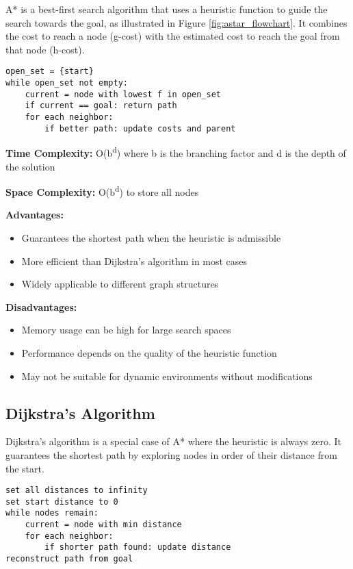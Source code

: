\documentclass[11pt,a4paper]{report}
\begin{document}
A* is a best-first search algorithm that uses a heuristic function to guide the search towards the goal, as illustrated in Figure \ref{fig:astar_flowchart}. It combines the cost to reach a node (g-cost) with the estimated cost to reach the goal from that node (h-cost).

\begin{verbatim}
open_set = {start}
while open_set not empty:
    current = node with lowest f in open_set
    if current == goal: return path
    for each neighbor:
        if better path: update costs and parent
\end{verbatim}

\textbf{Time Complexity:} O(b\textsuperscript{d}) where b is the branching factor and d is the depth of the solution

\textbf{Space Complexity:} O(b\textsuperscript{d}) to store all nodes

\textbf{Advantages:}
\begin{itemize}
    \item Guarantees the shortest path when the heuristic is admissible
    \item More efficient than Dijkstra's algorithm in most cases
    \item Widely applicable to different graph structures
\end{itemize}

\textbf{Disadvantages:}
\begin{itemize}
    \item Memory usage can be high for large search spaces
    \item Performance depends on the quality of the heuristic function
    \item May not be suitable for dynamic environments without modifications
\end{itemize}

\subsection{Dijkstra's Algorithm}
Dijkstra's algorithm is a special case of A* where the heuristic is always zero. It guarantees the shortest path by exploring nodes in order of their distance from the start.

\begin{verbatim}
set all distances to infinity
set start distance to 0
while nodes remain:
    current = node with min distance
    for each neighbor:
        if shorter path found: update distance
reconstruct path from goal
\end{verbatim}
\end{document}
